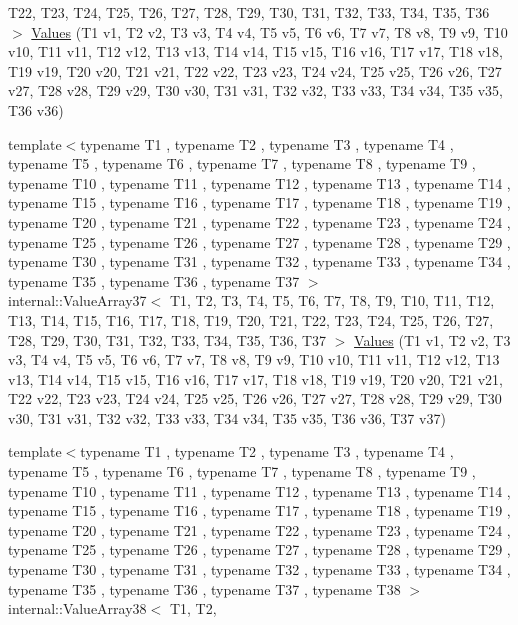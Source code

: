 \begin{DoxyCompactItemize}
\-T22, \-T23, \-T24, \-T25, \-T26, \-T27, \*
\-T28, \-T29, \-T30, \-T31, \-T32, \-T33, \*
\-T34, \-T35, \-T36 $>$ \hyperlink{namespacetesting_ae5d25537f4919c9e82d02c45af4c7c5f}{\-Values} (\-T1 v1, \-T2 v2, \-T3 v3, \-T4 v4, \-T5 v5, \-T6 v6, \-T7 v7, \-T8 v8, \-T9 v9, \-T10 v10, \-T11 v11, \-T12 v12, \-T13 v13, \-T14 v14, \-T15 v15, \-T16 v16, \-T17 v17, \-T18 v18, \-T19 v19, \-T20 v20, \-T21 v21, \-T22 v22, \-T23 v23, \-T24 v24, \-T25 v25, \-T26 v26, \-T27 v27, \-T28 v28, \-T29 v29, \-T30 v30, \-T31 v31, \-T32 v32, \-T33 v33, \-T34 v34, \-T35 v35, \-T36 v36)
\item 
{\footnotesize template$<$typename T1 , typename T2 , typename T3 , typename T4 , typename T5 , typename T6 , typename T7 , typename T8 , typename T9 , typename T10 , typename T11 , typename T12 , typename T13 , typename T14 , typename T15 , typename T16 , typename T17 , typename T18 , typename T19 , typename T20 , typename T21 , typename T22 , typename T23 , typename T24 , typename T25 , typename T26 , typename T27 , typename T28 , typename T29 , typename T30 , typename T31 , typename T32 , typename T33 , typename T34 , typename T35 , typename T36 , typename T37 $>$ }\\internal\-::\-Value\-Array37$<$ \-T1, \-T2, \*
\-T3, \-T4, \-T5, \-T6, \-T7, \-T8, \-T9, \*
\-T10, \-T11, \-T12, \-T13, \-T14, \-T15, \*
\-T16, \-T17, \-T18, \-T19, \-T20, \-T21, \*
\-T22, \-T23, \-T24, \-T25, \-T26, \-T27, \*
\-T28, \-T29, \-T30, \-T31, \-T32, \-T33, \*
\-T34, \-T35, \-T36, \-T37 $>$ \hyperlink{namespacetesting_aa800bbbe42a44b1776cfd61c9e337ab6}{\-Values} (\-T1 v1, \-T2 v2, \-T3 v3, \-T4 v4, \-T5 v5, \-T6 v6, \-T7 v7, \-T8 v8, \-T9 v9, \-T10 v10, \-T11 v11, \-T12 v12, \-T13 v13, \-T14 v14, \-T15 v15, \-T16 v16, \-T17 v17, \-T18 v18, \-T19 v19, \-T20 v20, \-T21 v21, \-T22 v22, \-T23 v23, \-T24 v24, \-T25 v25, \-T26 v26, \-T27 v27, \-T28 v28, \-T29 v29, \-T30 v30, \-T31 v31, \-T32 v32, \-T33 v33, \-T34 v34, \-T35 v35, \-T36 v36, \-T37 v37)
\item 
{\footnotesize template$<$typename T1 , typename T2 , typename T3 , typename T4 , typename T5 , typename T6 , typename T7 , typename T8 , typename T9 , typename T10 , typename T11 , typename T12 , typename T13 , typename T14 , typename T15 , typename T16 , typename T17 , typename T18 , typename T19 , typename T20 , typename T21 , typename T22 , typename T23 , typename T24 , typename T25 , typename T26 , typename T27 , typename T28 , typename T29 , typename T30 , typename T31 , typename T32 , typename T33 , typename T34 , typename T35 , typename T36 , typename T37 , typename T38 $>$ }\\internal\-::\-Value\-Array38$<$ \-T1, \-T2, \*

\end{DoxyCompactItemize}
